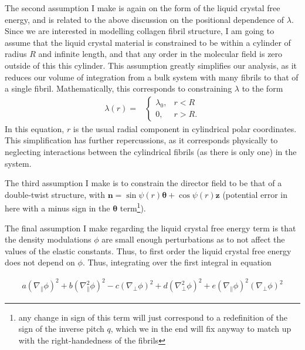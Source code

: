 \documentclass[12pt]{article}
\begin{document}
The second assumption I make is again on the form of the liquid crystal free energy, and is related to the above discussion on the positional dependence of $\lambda$. Since we are interested in modelling collagen fibril structure, I am going to assume that the liquid crystal material is constrained to be within a cylinder of radius $R$ and infinite length, and that any order in the molecular field is zero outside of this this cylinder. This assumption greatly simplifies our analysis, as it reduces our volume of integration from a bulk system with many fibrils to that of a single fibril. Mathematically, this corresponds to constraining $\lambda$ to the form
\begin{align}
\lambda(r)=&
	\begin{cases}
	\lambda_0,	& r<R\\
	0,			& r>R.
	\end{cases}
\end{align}
In this equation, $r$ is the usual radial component in cylindrical polar coordinates. This simplification has further repercussions, as it corresponds physically to neglecting interactions between the cylindrical fibrils (as there is only one) in the system.

The third assumption I make is to constrain the director field to be that of a double-twist structure, with $\bm{n}=\sin\psi(r)\bm{\theta}+\cos\psi(r)\bm{z}$ (potential error in here with a minus sign in the $\bm{\theta}$ term\footnote{any change in sign of this term will just correspond to a redefinition of the sign of the inverse pitch $q$, which we in the end will fix anyway to match up with the right-handedness of the fibrils}).

The final assumption I make regarding the liquid crystal free energy term is that the density modulations $\phi$ are small enough perturbations as to not affect the values of the elastic constants. Thus, to first order the liquid crystal free energy does not depend on $\phi$. Thus, integrating over the first integral in equation

\begin{align}
a(\nabla_{\parallel}\phi)^2+b(\nabla_{\parallel}^2\phi)^2-c(\nabla_{\bot}\phi)^2+d(\nabla_{\bot}^2\phi)^2+e(\nabla_{\parallel}\phi)^2(\nabla_{\bot}\phi)^2
\end{align}

	
\clearpage


\end{document}
